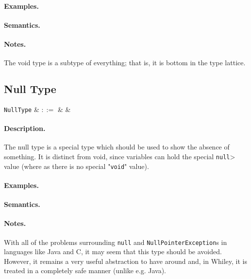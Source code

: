 \paragraph{Examples.}

\paragraph{Semantics.}

\paragraph{Notes.} The void type is a subtype of everything; that is, it is bottom in the type lattice.


\subsection{Null Type}

\begin{syntax}
  \verb+NullType+ & $::=$ &  &\\
\end{syntax}

\paragraph{Description.}  The null type is a special type which should
be used to show the absence of something. It is distinct from void,
since variables can hold the special \lstinline{null}> value (where as
there is no special "\lstinline{void}" value).

\paragraph{Examples.}

\paragraph{Semantics.}

\paragraph{Notes.}  With all of the problems surrounding
\lstinline{null} and \lstinline{NullPointerException}s in languages
like Java and C, it may seem that this type should be
avoided. However, it remains a very useful abstraction to have around
and, in Whiley, it is treated in a completely safe manner (unlike
e.g. Java).

